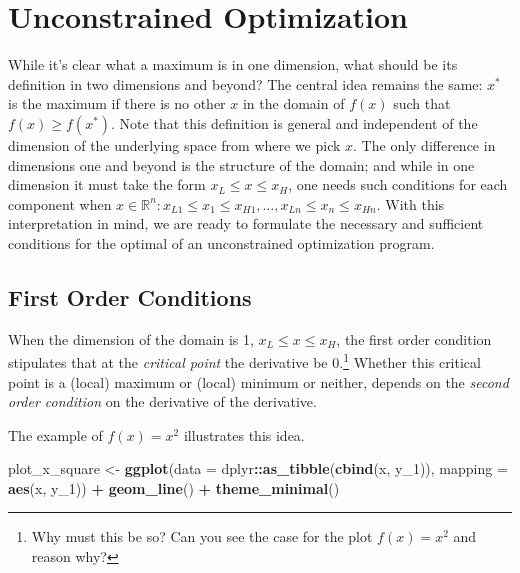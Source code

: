 \documentclass[11pt,]{article}
\newenvironment{Shaded}{\begin{snugshade}}{\end{snugshade}}
\newcommand{\KeywordTok}[1]{\textcolor[rgb]{0.13,0.29,0.53}{\textbf{#1}}}
\newcommand{\DataTypeTok}[1]{\textcolor[rgb]{0.13,0.29,0.53}{#1}}
\newcommand{\DecValTok}[1]{\textcolor[rgb]{0.00,0.00,0.81}{#1}}
\newcommand{\StringTok}[1]{\textcolor[rgb]{0.31,0.60,0.02}{#1}}
\newcommand{\OperatorTok}[1]{\textcolor[rgb]{0.81,0.36,0.00}{\textbf{#1}}}
\newcommand{\NormalTok}[1]{#1}
\let\rmarkdownfootnote\footnote%
\def\footnote{\protect\rmarkdownfootnote}
\begin{document}
\section{Unconstrained Optimization}\label{unconstrained-optimization}

While it's clear what a maximum is in one dimension, what should be its
definition in two dimensions and beyond? The central idea remains the
same: \(x^*\) is the maximum if there is no other \(x\) in the domain of
\(f(x)\) such that \(f(x)\geq f(x^*)\). Note that this definition is
general and independent of the dimension of the underlying space from
where we pick \(x\). The only difference in dimensions one and beyond is
the structure of the domain; and while in one dimension it must take the
form \(x_L\leq x\leq x_H\), one needs such conditions for each component
when
\(x\in \mathbb{R}^n: x_{L1}\leq x_1\leq x_{H1}, \hdots, x_{Ln}\leq x_n\leq x_{Hn}\).
With this interpretation in mind, we are ready to formulate the
necessary and sufficient conditions for the optimal of an unconstrained
optimization program.

\subsection{First Order Conditions}\label{first-order-conditions}

When the dimension of the domain is 1, \(x_L\leq x\leq x_H\), the first
order condition stipulates that at the \emph{critical point} the
derivative be 0.\footnote{Why must this be so? Can you see the case for
  the plot \(f(x) = x^2\) and reason why?} Whether this critical point
is a (local) maximum or (local) minimum or neither, depends on the
\emph{second order condition} on the derivative of the derivative.

The example of \(f(x) = x^2\) illustrates this idea.

\begin{Shaded}
\begin{Highlighting}[]
\NormalTok{plot_x_square <-}\StringTok{ }\KeywordTok{ggplot}\NormalTok{(}\DataTypeTok{data =}\NormalTok{ dplyr}\OperatorTok{::}\KeywordTok{as_tibble}\NormalTok{(}\KeywordTok{cbind}\NormalTok{(x, y_}\DecValTok{1}\NormalTok{)),}
       \DataTypeTok{mapping =} \KeywordTok{aes}\NormalTok{(x, y_}\DecValTok{1}\NormalTok{)) }\OperatorTok{+}
\StringTok{  }\KeywordTok{geom_line}\NormalTok{() }\OperatorTok{+}
\StringTok{  }\KeywordTok{theme_minimal}\NormalTok{()}
\end{Highlighting}
\end{Shaded}
\end{document}
